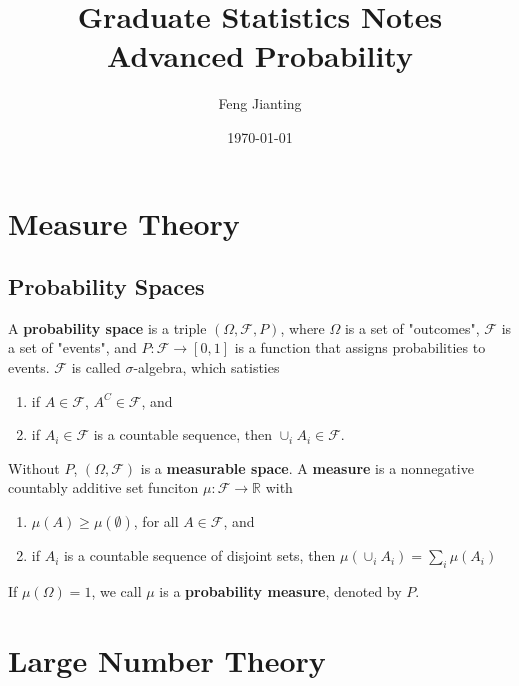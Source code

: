 \documentclass{amsbook}
\begin{document}
\title{Graduate Statistics Notes \\ Advanced Probability}
\author{Feng Jianting}
\date{\today}
\maketitle
\tableofcontents
\section{Measure Theory}
\subsection{Probability Spaces}
A \textbf{probability space} is a triple $(\Omega, \mathcal{F}, P)$, where $\Omega$ is a set of "outcomes", $\mathcal{F}$ is a set of "events", and $P: \mathcal{F}\to [0, 1]$ is a function that assigns probabilities to events. $\mathcal{F}$ is called $\sigma$-algebra, which satisties
\begin{enumerate}
	\item if $A\in\mathcal{F}$, $A^C\in\mathcal{F}$, and
	\item if $A_i \in \mathcal{F}$ is a countable sequence, then $\cup_{i}A_i\in \mathcal{F}$.
\end{enumerate}
Without $P$, $(\Omega,\mathcal{F})$ is a \textbf{measurable space}. A \textbf{measure} is a nonnegative countably additive set funciton $\mu: \mathcal{F}\to \mathbb{R}$ with
\begin{enumerate}
	\item $\mu(A)\geq\mu(\emptyset)$, for all $A\in \mathcal{F}$, and
	\item if $A_i$ is a countable sequence of disjoint sets, then $
		      \mu(\cup_i A_i) = \sum_i \mu(A_i)
	      $
\end{enumerate}
If $\mu(\Omega) = 1$, we call $\mu$ is a \textbf{probability measure}, denoted by $P$.
\section{Large Number Theory}

% 
% 
\end{document}
